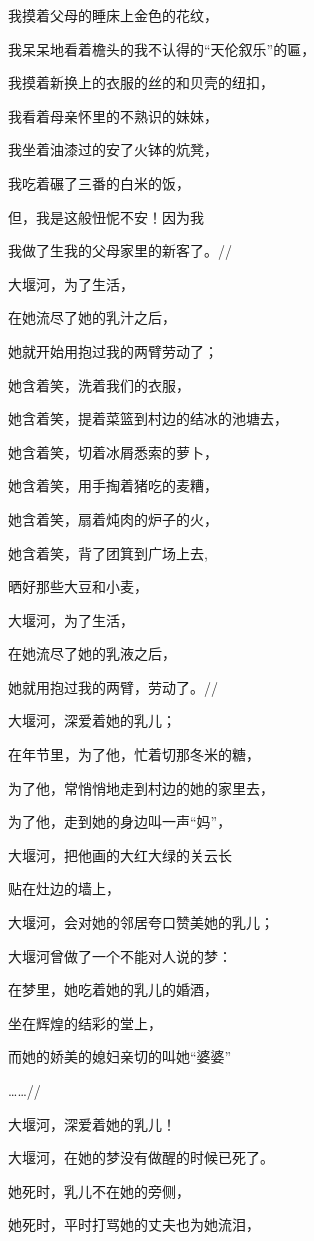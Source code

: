 \documentclass[letterpaper,10pt,english]{sphinxmanual}
\begin{document}
我摸着父母的睡床上金色的花纹，

我呆呆地看着檐头的我不认得的“天伦叙乐”的匾，

我摸着新换上的衣服的丝的和贝壳的纽扣，

我看着母亲怀里的不熟识的妹妹，

我坐着油漆过的安了火钵的炕凳，

我吃着碾了三番的白米的饭，

但，我是这般忸怩不安！因为我

我做了生我的父母家里的新客了。//

大堰河，为了生活，

在她流尽了她的乳汁之后，

她就开始用抱过我的两臂劳动了；

她含着笑，洗着我们的衣服，

她含着笑，提着菜篮到村边的结冰的池塘去，

她含着笑，切着冰屑悉索的萝卜，

她含着笑，用手掏着猪吃的麦糟，

她含着笑，扇着炖肉的炉子的火，

她含着笑，背了团箕到广场上去,

晒好那些大豆和小麦，

大堰河，为了生活，

在她流尽了她的乳液之后，

她就用抱过我的两臂，劳动了。//

大堰河，深爱着她的乳儿；

在年节里，为了他，忙着切那冬米的糖，

为了他，常悄悄地走到村边的她的家里去，

为了他，走到她的身边叫一声“妈”，

大堰河，把他画的大红大绿的关云长

贴在灶边的墙上，

大堰河，会对她的邻居夸口赞美她的乳儿；

大堰河曾做了一个不能对人说的梦：

在梦里，她吃着她的乳儿的婚酒，

坐在辉煌的结彩的堂上，

而她的娇美的媳妇亲切的叫她“婆婆”

……//

大堰河，深爱着她的乳儿！

大堰河，在她的梦没有做醒的时候已死了。

她死时，乳儿不在她的旁侧，

她死时，平时打骂她的丈夫也为她流泪，
\end{document}
